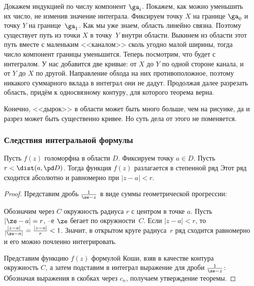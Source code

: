 \documentclass[a4paper]{article}
\begin{document}
Докажем индукцией по числу компонент $\ga_i$. Покажем, как можно уменьшить
их число, не изменив значение интеграла. Фиксируем точку $X$ на границе $\ga_0$ и точку $Y$ на границе~$\ga_1$.
Как мы уже знаем, область линейно связна. Поэтому существует путь из точки $X$ в точку~$Y$ внутри области.
Выкинем из области этот путь вместе с маленьким <<каналом>> сколь угодно малой ширины, тогда число компонент
границы уменьшится. Теперь посмотрим, что будет с интегралом. У нас добавится две кривые: от $X$ до $Y$ по одной
стороне канала, и от $Y$ до $X$ по другой. Направление обхода на них противоположное, поэтому никакого суммарного вклада
в интеграл они не дадут. Продолжая далее разрезать область, придём к односвязному контуру, для которого теорема верна.

\begin{note}
Конечно, <<дырок>> в области может быть много больше, чем на рисунке, да и разрез может быть существенно кривее.
Но суть дела от этого не поменяется.
\end{note}


\subsubsection{Следствия интегральной формулы}

\begin{theorem}
Пусть $f(z)$ голоморфна в области $D$. Фиксируем точку $a \in D$. Пусть $r < \dist(a, \pd D)$.
Тогда функция $f(z)$ разлагается в степенной ряд
Этот ряд сходится абсолютно и равномерно при $|z-a| < r$.
\end{theorem}
\begin{proof}
Представим дробь $\frac{1}{\ze-z}$ в виде суммы геометрической прогрессии:

Обозначим через $C$ окружность радиуса $r$ с центром в точке $a$.
Пусть $|\ze-a|=r$, --е $\ze$ бегает по окружности~$C$. Если $|z-a| < r$, то
$\frac{|z-a|}{|\ze-a|}  = \frac{|z-a|}{r} < 1$. Значит, в открытом круге радиуса~$r$
ряд сходится равномерно и его можно почленно интегрировать.

Представим функцию $f(z)$ формулой Коши, взяв в качестве контура окружность $C$, а затем подставим в интеграл
выражение для дроби $\frac{1}{\ze-z}$:
Обозначая выражения в скобках через $c_n$, получаем утверждение теоремы.
\end{proof}
\end{document}
